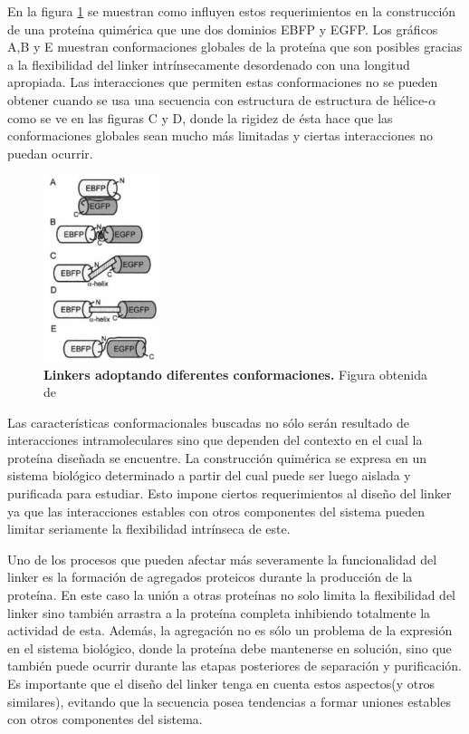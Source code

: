 En la figura \ref{conformacionLinker} se muestran como influyen estos requerimientos en la construcción de una proteína quimérica que une dos dominios EBFP y EGFP. 
Los gráficos A,B y E muestran conformaciones globales de la proteína que son posibles gracias a la flexibilidad del linker intrínsecamente desordenado con una longitud apropiada. 
Las interacciones que permiten estas conformaciones no se pueden obtener cuando se usa una secuencia con estructura de estructura de hélice-$\alpha$ como se ve en las figuras C y D, donde la rigidez de ésta
hace que las conformaciones globales sean mucho más limitadas y ciertas interacciones no puedan ocurrir.


\begin{figure}[htbp]
\centering
\includegraphics[width=0.3\textwidth]{img/conformacionLinker.png} 
\caption{\textbf{Linkers adoptando diferentes conformaciones.} Figura obtenida de \cite{arai2004conformations}}
\label{conformacionLinker}
\end{figure}



Las características conformacionales buscadas no sólo serán resultado de interacciones intramoleculares sino que dependen del contexto en el cual la proteína diseñada se encuentre. 
La construcción quimérica se expresa en un sistema biológico determinado a partir del cual puede ser luego aislada y purificada para estudiar. 
Esto impone ciertos requerimientos al diseño del linker ya que las interacciones estables con otros componentes del sistema pueden limitar seriamente la flexibilidad intrínseca de este.

Uno de los procesos que pueden afectar más severamente la funcionalidad del linker es la formación de agregados proteicos durante la producción de la proteína\cite{lebendiker2014production}.
En este caso la unión a otras proteínas no solo limita la flexibilidad del linker sino también arrastra a la proteína completa inhibiendo totalmente la actividad de esta.
Además, la agregación no es sólo un problema de la expresión en el sistema biológico, donde la proteína debe mantenerse en solución,
sino que también puede ocurrir durante las etapas posteriores de separación y purificación.
Es importante que el diseño del linker tenga en cuenta estos aspectos(y otros similares), evitando que la secuencia posea tendencias a formar uniones estables con otros componentes del sistema.


